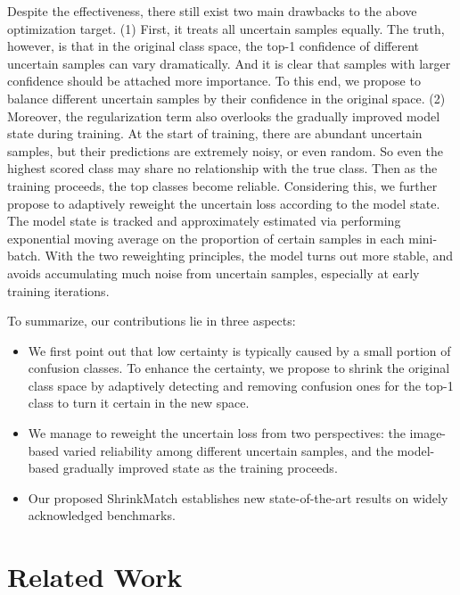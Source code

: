\documentclass[10pt,twocolumn,letterpaper]{article}
\begin{document}
Despite the effectiveness, there still exist two main drawbacks to the above optimization target. (1) First, it treats all uncertain samples equally. The truth, however, is that in the original class space, the top-1 confidence of different uncertain samples can vary dramatically. And it is clear that samples with larger confidence should be attached more importance. To this end, we propose to balance different uncertain samples by their confidence in the original space. (2) Moreover, the regularization term also overlooks the gradually improved model state during training. At the start of training, there are abundant uncertain samples, but their predictions are extremely noisy, or even random. So even the highest scored class may share no relationship with the true class. Then as the training proceeds, the top classes become reliable. Considering this, we further propose to adaptively reweight the uncertain loss according to the model state. The model state is tracked and approximately estimated via performing exponential moving average on the proportion of certain samples in each mini-batch. With the two reweighting principles, the model turns out more stable, and avoids accumulating much noise from uncertain samples, especially at early training iterations.

To summarize, our contributions lie in three aspects:

\begin{itemize}
    \item We first point out that low certainty is typically caused by a small portion of confusion classes. To enhance the certainty, we propose to shrink the original class space by adaptively detecting and removing confusion ones for the top-1 class to turn it certain in the new space.
    \item We manage to reweight the uncertain loss from two perspectives: the image-based varied reliability among different uncertain samples, and the model-based gradually improved state as the training proceeds.
    \item Our proposed ShrinkMatch establishes new state-of-the-art results on widely acknowledged benchmarks.
\end{itemize} \section{Related Work}
\end{document}
